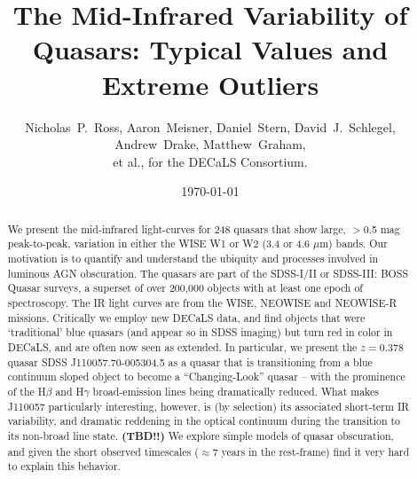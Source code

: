 \documentclass{emulateapj}
\begin{document}

\title{The Mid-Infrared Variability of Quasars: 
         Typical Values and Extreme Outliers
}
\author{
Nicholas~P.~Ross, 
Aaron~Meisner, 
Daniel~Stern,
David~J.~Schlegel,
Andrew~Drake, 
Matthew~Graham, \\
et al.,  
for the DECaLS Consortium. 
}


\date{\today}

\begin{abstract}
We present the mid-infrared light-curves for 248 quasars that show
large, $>$0.5 mag peak-to-peak, variation in either the WISE W1 or W2
(3.4 or 4.6 $\mu$m) bands. Our motivation is to quantify and
understand the ubiquity and processes involved in luminous AGN
obscuration.  The quasars are part of the SDSS-I/II or SDSS-III: BOSS
Quasar surveys, a superset of over 200,000 objects with at least one
epoch of spectroscopy. The IR light curves are from the WISE, NEOWISE
and NEOWISE-R missions.
Critically we employ new DECaLS data, and find objects that were
`traditional' blue quasars (and appear so in SDSS imaging) but turn
red in color in DECaLS, and are often now seen as extended.
In particular, we present the $z=0.378$ quasar SDSS
J110057.70-005304.5 as a quasar that is transitioning from a blue
continuum sloped object to become a ``Changing-Look'' quasar -- with the
prominence of the H$\beta$ and H$\gamma$ broad-emission lines being
dramatically reduced. What makes J110057 particularly interesting,
however, is (by selection) its associated short-term IR variability,
and dramatic reddening in the optical continuum during the transition
to its non-broad line state.
{\bf (TBD!!)} We explore simple models of quasar obscuration, and
given the short observed timescales ($\approx$7 years in the rest-frame) 
find it very hard to explain this behavior.
\end{abstract}
\end{document}
